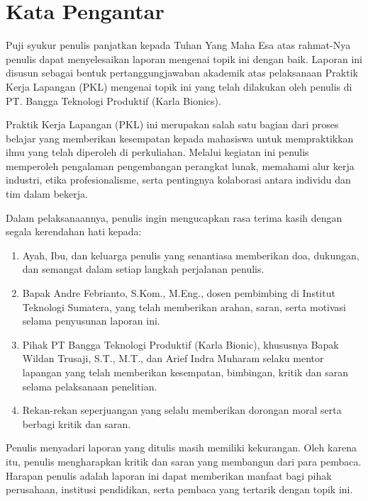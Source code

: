 \chapter*{Kata Pengantar}

Puji syukur penulis panjatkan kepada Tuhan Yang Maha Esa atas rahmat-Nya penulis dapat menyelesaikan laporan mengenai topik ini dengan baik. Laporan ini disusun sebagai bentuk pertanggungjawaban akademik atas pelaksanaan Praktik Kerja Lapangan (PKL) mengenai topik ini yang telah dilakukan oleh penulis di PT. Bangga Teknologi Produktif (Karla Bionics).

Praktik Kerja Lapangan (PKL) ini merupakan salah satu bagian dari proses belajar yang memberikan kesempatan kepada mahasiswa untuk mempraktikkan ilmu yang telah diperoleh di perkuliahan. Melalui kegiatan ini penulis memperoleh pengalaman pengembangan perangkat lunak, memahami alur kerja industri, etika profesionalisme, serta pentingnya kolaborasi antara individu dan tim dalam bekerja.

Dalam pelaksanaannya, penulis ingin mengucapkan rasa terima kasih dengan segala kerendahan hati kepada:
\begin{enumerate}
    \item Ayah, Ibu, dan keluarga penulis yang senantiasa memberikan doa, dukungan, dan semangat dalam setiap langkah perjalanan penulis.
    \item Bapak Andre Febrianto, S.Kom., M.Eng., dosen pembimbing di Institut Teknologi Sumatera, yang telah memberikan arahan, saran, serta motivasi selama penyusunan laporan ini.
    \item Pihak PT Bangga Teknologi Produktif (Karla Bionic), khususnya Bapak Wildan Trusaji, S.T., M.T., dan Arief Indra Muharam selaku mentor lapangan yang telah memberikan kesempatan, bimbingan, kritik dan saran selama pelaksanaan penelitian.
    \item Rekan-rekan seperjuangan yang selalu memberikan dorongan moral serta berbagi kritik dan saran.
\end{enumerate}

Penulis menyadari laporan yang ditulis masih memiliki kekurangan. Oleh karena itu, penulis mengharapkan kritik dan saran yang membangun dari para pembaca. Harapan penulis adalah laporan ini dapat memberikan manfaat bagi pihak perusahaan, institusi pendidikan, serta pembaca yang tertarik dengan topik ini.

